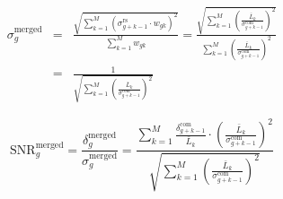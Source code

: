 \begin{eqnarray}
  \sigma_{g}^\text{merged} & =  & \frac{ \sqrt{\sum\limits_{k = 1}^{M} \left(\sigma_{g+k-1}^\text{rs} \cdot {w_{gk}}\right)^2}}{\sum\limits_{k = 1}^{M} {w_{gk}}} = \frac{\sqrt{\sum\limits_{k = 1}^{M} \left(\frac{\bar{L}_{k}}{\sigma_{g+k-1}^\text{com}}\right)^2}}{\sum\limits_{k = 1}^{M} \left(\frac{\bar{L}_{k}}{\sigma_{g+k-1}^\text{com}}\right)^2}  \nonumber \\
    & = & \frac{1}{\sqrt{\sum\limits_{k = 1}^{M} \left(\frac{\bar{L}_{k}}{\sigma_{g+k-1}^\text{com}}\right)^2}}
    \label{eq:merged_sigma}
\end{eqnarray}

\begin{equation}
    \label{eq:merged_snr}
    \text{SNR}_{g}^\text{merged} = \frac{\delta^\text{merged}_{g}}{\sigma^\text{merged}_{g}} = \frac{\sum\limits_{k = 1}^{M}\frac{\delta_{g+k-1}^\text{com}}{\bar{L}_{k}} \cdot \left(\frac{\bar{L}_{k}}{\sigma_{g+k-1}^\text{com}}\right)^2}{\sqrt{\sum\limits_{k = 1}^{M} \left(\frac{\bar{L}_{k}}{\sigma_{g+k-1}^\text{com}}\right)^2}}
\end{equation}





